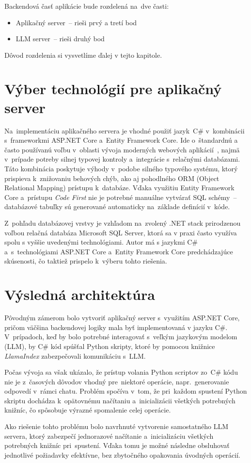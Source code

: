 Backendová časť aplikácie bude rozdelená na~dve časti:
\begin{itemize}
\item Aplikačný server~-- rieši prvý a tretí bod
\item LLM server~-- rieši druhý bod
\end{itemize}

Dôvod rozdelenia si vysvetlíme ďalej v tejto kapitole.

\section{Výber technológií pre aplikačný server}

Na~implementáciu aplikačného servera je vhodné použiť jazyk~C\# v~kombinácii s~frameworkmi ASP.NET Core a~Entity Framework Core. Ide o~štandardnú a často používanú voľbu v~oblasti vývoja moderných webových aplikácií~\cite{top-backend-languages}, najmä v~prípade potreby silnej typovej kontroly a~integrácie s~relačnými databázami. Táto kombinácia poskytuje výhody v~podobe silného typového systému, ktorý prispieva k~znižovaniu behových chýb, ako aj pohodlného ORM (Object Relational Mapping) prístupu k~databáze. Vďaka využitiu Entity Framework Core a~prístupu \textit{Code First} nie je potrebné manuálne vytvárať SQL schémy~-- databázové tabuľky sú generované automaticky na~základe definícií v~kóde.

Z~pohľadu databázovej vrstvy je vzhľadom na~zvolený .NET stack prirodzenou voľbou relačná databáza Microsoft SQL Server, ktorá sa v praxi často využíva spolu s vyššie uvedenými technológiami. Autor má s jazykmi C\# a~s~technológiami ASP.NET Core a~Entity Framework Core predchádzajúce skúsenosti, čo taktiež prispelo k~výberu tohto riešenia.



\section{Výsledná architektúra}

Pôvodným zámerom bolo vytvoriť aplikačný server s~využitím ASP.NET Core, pričom väčšina backendovej logiky mala byť implementovaná v jazyku C\#. V~prípadoch, keď by bolo potrebné interagovať s~veľkým jazykovým modelom (LLM), by C\# kód spúšťal Python skripty, ktoré by pomocou knižnice \textit{LlamaIndex} zabezpečovali komunikáciu s~LLM.

Počas vývoja sa však ukázalo, že prístup volania Python scriptov zo~C\# kódu nie je z~časových dôvodov vhodný pre~niektoré operácie, napr.~generovanie odpovedí v~rámci chatu. Problém spočíva v~tom, že pri~každom spustení Python skriptu dochádza k~opätovnému načítaniu a~inicializácii všetkých potrebných knižníc, čo spôsobuje výrazné spomalenie celej operácie.

Ako riešenie tohto problému bolo navrhnuté vytvorenie samostatného LLM servera, ktorý zabezpečí jednorazové načítanie a~inicializáciu všetkých potrebných knižníc pri~spustení. Vďaka tomu je možné následne obsluhovať jednotlivé požiadavky efektívne, bez zbytočného opakovania úvodných operácií.
